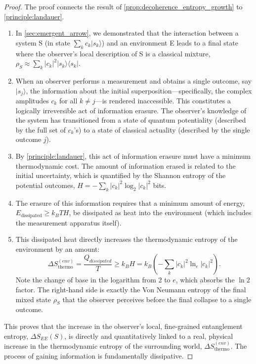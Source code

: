 \documentclass[11pt, letterpaper]{report}
\theoremstyle{plain} %
\theoremstyle{definition} %
\theoremstyle{remark} %
\begin{document}
\begin{proof}
The proof connects the result of \cref{prop:decoherence_entropy_growth} to \cref{principle:landauer}.
\begin{enumerate}
    \item In \cref{sec:emergent_arrow}, we demonstrated that the interaction between a system S (in state $\sum_k c_k |s_k\rangle$) and an environment E leads to a final state where the observer's local description of S is a classical mixture, $\rho_S \approx \sum_k |c_k|^2 |s_k\rangle\langle s_k|$.
    \item When an observer performs a measurement and obtains a single outcome, say $|s_j\rangle$, the information about the initial superposition—specifically, the complex amplitudes $c_k$ for all $k \neq j$—is rendered inaccessible. This constitutes a logically irreversible act of information erasure. The observer's knowledge of the system has transitioned from a state of quantum potentiality (described by the full set of $c_k$'s) to a state of classical actuality (described by the single outcome $j$).
    \item By \cref{principle:landauer}, this act of information erasure must have a minimum thermodynamic cost. The amount of information erased is related to the initial uncertainty, which is quantified by the Shannon entropy of the potential outcomes, $H = -\sum_k |c_k|^2 \log_2 |c_k|^2$ bits.
    \item The erasure of this information requires that a minimum amount of energy, $E_{\text{dissipated}} \ge k_B T H$, be dissipated as heat into the environment (which includes the measurement apparatus itself).
    \item This dissipated heat directly increases the thermodynamic entropy of the environment by an amount:
    \begin{equation}
        \Delta S_{\text{thermo}}^{(env)} = \frac{Q_{dissipated}}{T} \ge k_B H = k_B \left(-\sum_k |c_k|^2 \ln_e |c_k|^2\right).
        \label{eq:thermo_entropy_increase}
    \end{equation}
    Note the change of base in the logarithm from 2 to $e$, which absorbs the $\ln 2$ factor. The right-hand side is exactly the Von Neumann entropy of the final mixed state $\rho_S$ that the observer perceives before the final collapse to a single outcome.
\end{enumerate}
This proves that the increase in the observer's local, fine-grained entanglement entropy, $\Delta S_{EE}(S)$, is directly and quantitatively linked to a real, physical increase in the thermodynamic entropy of the surrounding world, $\Delta S_{\text{thermo}}^{(env)}$. The process of gaining information is fundamentally dissipative.
\end{proof}
\end{document}
